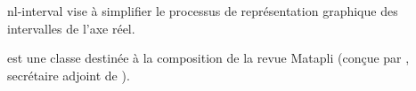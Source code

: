 \documentclass[for-authors]{letgut}
\begin{document}
\begin{ctannews}
\item[nl-interval] vise à simplifier le processus de représentation
graphique des intervalles de l'axe réel.
\item*[matapli] est une classe  destinée à la composition
de la revue Matapli (conçue par , secrétaire
adjoint de \gutenberg{}).
\end{ctannews}
\end{document}
